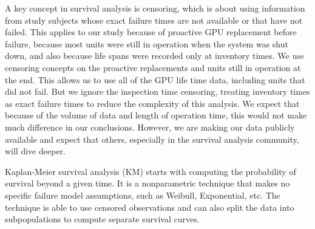 A key concept in survival analysis is censoring, which is about using
information from study subjects whose exact failure times are not
available or that have not failed. This applies to our study because
of proactive GPU replacement before failure, because most units were
still in operation when the system was shut down, and also because
life spans were recorded only at inventory times. We use censoring
concepts on the proactive replacements and units still in operation at
the end. This allows us to use all of the GPU life time data,
including units that did not fail. But we ignore the inspection time
censoring, treating inventory times as exact failure times to reduce
the complexity of this analysis. We expect that because of the volume
of data and length of operation time, this would not make much
difference in our conclusions. However, we are making our data
publicly available and expect that others, especially in the survival
analysis community, will dive deeper.

Kaplan-Meier survival analysis (KM) starts with computing the
probability of survival beyond a given time. It is a nonparametric
technique that makes no specific failure model assumptions, such as
Weibull, Exponential, etc. The technique is able to use censored
observations and can also split the data into subpopulations to
compute separate survival curves.

